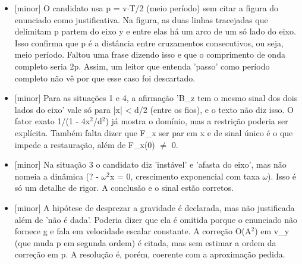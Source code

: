 \documentclass{article}%
\begin{document}
\begin{itemize}%
\item%
{[}minor{]} O candidato usa p = v$\cdot$T/2 (meio período) sem citar a figura do enunciado como justificativa. Na figura, as duas linhas tracejadas que delimitam p partem do eixo y e entre elas há um arco de um só lado do eixo. Isso confirma que p é a distância entre cruzamentos consecutivos, ou seja, meio período. Faltou uma frase dizendo isso e que o comprimento de onda completo seria 2p. Assim, um leitor que entenda 'passo' como período completo não vê por que esse caso foi descartado.%
\item%
{[}minor{]} Para as situações 1 e 4, a afirmação 'B\_z tem o mesmo sinal dos dois lados do eixo' vale só para |x| < d/2 (entre os fios), e o texto não diz isso. O fator exato 1/(1 - 4x$^2$/d$^2$) já mostra o domínio, mas a restrição poderia ser explícita. Também falta dizer que F\_x ser par em x e de sinal único é o que impede a restauração, além de F\_x(0) $\neq$ 0.%
\item%
{[}minor{]} Na situação 3 o candidato diz 'instável' e 'afasta do eixo', mas não nomeia a dinâmica (? - $\omega$$^2$x = 0, crescimento exponencial com taxa $\omega$). Isso é só um detalhe de rigor. A conclusão e o sinal estão corretos.%
\item%
{[}minor{]} A hipótese de desprezar a gravidade é declarada, mas não justificada além de 'não é dada'. Poderia dizer que ela é omitida porque o enunciado não fornece g e fala em velocidade escalar constante. A correção O(A$^2$) em v\_y (que muda p em segunda ordem) é citada, mas sem estimar a ordem da correção em p. A resolução é, porém, coerente com a aproximação pedida.%
\end{itemize}%
\end{document}
